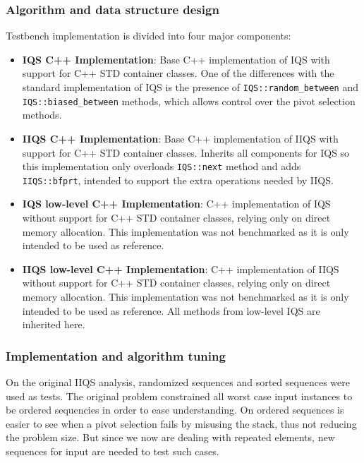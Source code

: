 \subsubsection{Algorithm and data structure design}
Testbench implementation is divided into four major components:\\

\begin{itemize}
    \item{
        \textbf{IQS C++ Implementation}: Base C++ implementation of IQS with support for C++ STD container classes. One of the differences with the standard implementation of IQS is the presence of \texttt{IQS::random\_between} and \texttt{IQS::biased\_between} methods, which allows control over the pivot selection methods.
    }
    \item{
        \textbf{IIQS C++ Implementation}: Base C++ implementation of IIQS with support for C++ STD container classes. Inherits all components for IQS so this implementation only overloads \texttt{IQS::next} method and adds \texttt{IIQS::bfprt}, intended to support the extra operations needed by IIQS.
    }
    \item{
        \textbf{IQS low-level C++ Implementation}: C++ implementation of IQS without support for C++ STD container classes, relying only on direct memory allocation. This implementation was not benchmarked as it is only intended to be used as reference.
    }
    \item{
        \textbf{IIQS low-level C++ Implementation}: C++ implementation of IIQS without support for C++ STD container classes, relying only on direct memory allocation. This implementation was not benchmarked as it is only intended to be used as reference. All methods from low-level IQS are inherited here.
    }
\end{itemize}

\subsubsection{Implementation and algorithm tuning}
On the original IIQS analysis, randomized sequences and sorted sequences were used as tests. The original problem constrained all worst case input instances to be ordered sequencies in order to ease understanding. On ordered sequences is easier to see when a pivot selection fails by misusing the stack, thus not reducing the problem size. But since we now are dealing with repeated elements, new sequences for input are needed to test such cases.\\

